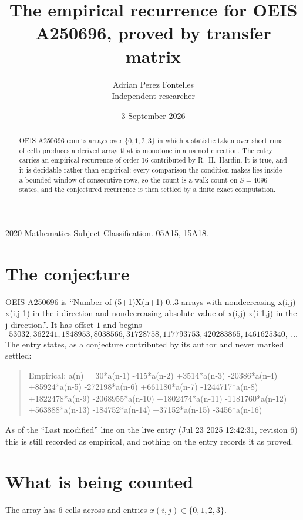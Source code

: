 \documentclass[11pt,a4paper]{article}
\title{The empirical recurrence for OEIS A250696, proved by transfer matrix}
\author{Adrian Perez Fontelles\\ \small Independent researcher}
\date{3 September 2026}
\theoremstyle{plain}
\theoremstyle{definition}
\begin{document}
\maketitle

\begin{abstract}
OEIS A250696 counts arrays over $\{0,1,2,3\}$ in which a statistic taken over short runs
of cells produces a derived array that is monotone in a named direction. The entry carries an
empirical recurrence of order $16$ contributed by R.~H.~Hardin. It is true, and it is
decidable rather than empirical: every comparison the condition makes lies inside a bounded
window of consecutive rows, so the count is a walk count on $S=4096$ states, and the
conjectured recurrence is then settled by a finite exact computation.
\end{abstract}

\noindent\small 2020 Mathematics Subject Classification. 05A15, 15A18.\normalsize

\section{The conjecture}

OEIS A250696 is ``Number of (5+1)X(n+1) 0..3 arrays with nondecreasing x(i,j)-x(i,j-1) in the i direction and nondecreasing absolute value of x(i,j)-x(i-1,j) in the j direction.''. It has offset $1$ and begins
\[
53032, 362241, 1848953, 8038566, 31728758, 117793753, 420283865, 1461625340,\ \dots
\]
The entry states, as a conjecture contributed by its author and never marked settled:
\begin{quote}
Empirical: a(n) = 30*a(n-1) -415*a(n-2) +3514*a(n-3) -20386*a(n-4) +85924*a(n-5) -272198*a(n-6) +661180*a(n-7) -1244717*a(n-8) +1822478*a(n-9) -2068955*a(n-10) +1802474*a(n-11) -1181760*a(n-12) +563888*a(n-13) -184752*a(n-14) +37152*a(n-15) -3456*a(n-16)
\end{quote}
As of the ``Last modified'' line on the live entry (Jul 23 2025 12:42:31, revision 6) this is still
recorded as empirical, and nothing on the entry records it as proved.

\section{What is being counted}

The array has $6$ cells across and entries $x(i,j)\in\{0,1,2,3\}$.
\end{document}
